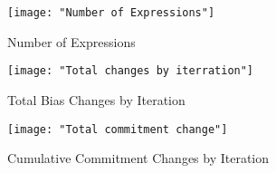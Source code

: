 \documentclass[]{article}
\begin{document}
\begin{figure}
	\centering
	\texttt{[image: "Number of Expressions"]}
	\caption{Number of Expressions}
	\label{fig:expressions}
\end{figure} 

\begin{figure}
	\centering
	\texttt{[image: "Total changes by iterration"]}
	\caption{Total Bias Changes by Iteration}
	\label{fig:changes by iteration}
\end{figure} 

\begin{figure}
	\centering
	\texttt{[image: "Total commitment change"]}
	\caption{Cumulative Commitment Changes by Iteration}
	\label{fig:commitment changes}
\end{figure} 
\end{document}
